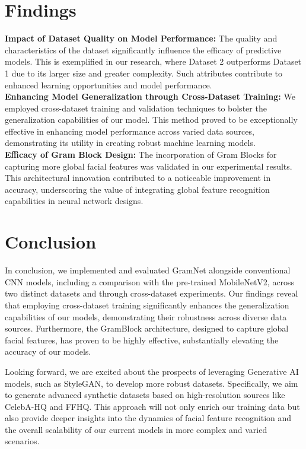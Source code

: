 \documentclass[final]{cvpr}
\begin{document}
\section{Findings}
\textbf{Impact of Dataset Quality on Model Performance:} The quality and characteristics of the dataset significantly influence the efficacy of predictive models. This is exemplified in our research, where Dataset 2 outperforms Dataset 1 due to its larger size and greater complexity. Such attributes contribute to enhanced learning opportunities and model performance.\\

\textbf{ Enhancing Model Generalization through Cross-Dataset Training:} We employed cross-dataset training and validation techniques to bolster the generalization capabilities of our model. This method proved to be exceptionally effective in enhancing model performance across varied data sources, demonstrating its utility in creating robust machine learning models.\\

\textbf{ Efficacy of Gram Block Design:} The incorporation of Gram Blocks for capturing more global facial features was validated in our experimental results. This architectural innovation contributed to a noticeable improvement in accuracy, underscoring the value of integrating global feature recognition capabilities in neural network designs.

\section{Conclusion}
In conclusion, we implemented and evaluated GramNet alongside conventional CNN models, including a comparison with the pre-trained MobileNetV2, across two distinct datasets and through cross-dataset experiments. Our findings reveal that employing cross-dataset training significantly enhances the generalization capabilities of our models, demonstrating their robustness across diverse data sources. Furthermore, the GramBlock architecture, designed to capture global facial features, has proven to be highly effective, substantially elevating the accuracy of our models.

Looking forward, we are excited about the prospects of leveraging Generative AI models, such as StyleGAN\cite{karras2019stylebased}, to develop more robust datasets. Specifically, we aim to generate advanced synthetic datasets based on high-resolution sources like CelebA-HQ and FFHQ. This approach will not only enrich our training data but also provide deeper insights into the dynamics of facial feature recognition and the overall scalability of our current models in more complex and varied scenarios.

\nocite{*}

{\small
}
\end{document}
